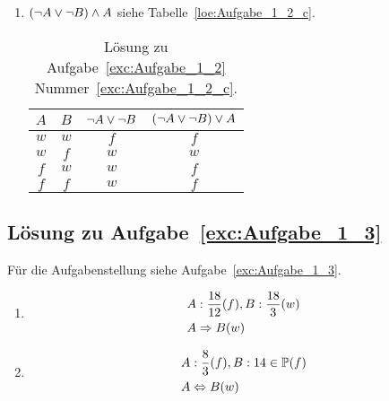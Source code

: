 \begin{enumerate}
\item $\left(\neg A \vee \neg B\right) \wedge A$ siehe Tabelle~\vref{loe:Aufgabe_1_2_c}.
	\begin{table}[htb]
	\center
	\begin{tabular}{c|c||c|c}
	$A$ & $B$ & $\neg A \vee \neg B$ & $\left(\neg A \vee \neg B\right) \vee A$\\\hline
	$w$ & $w$ & $f$ & $f$\\
	$w$ & $f$ & $w$ & $w$\\
	$f$ & $w$ & $w$ & $f$\\
	$f$ & $f$ & $w$ & $f$\\
	\end{tabular}
	\caption{Lösung zu Aufgabe~\ref{exc:Aufgabe_1_2} Nummer~\ref{exc:Aufgabe_1_2_c}.}
	\label{loe:Aufgabe_1_2_c}
	\end{table}
\end{enumerate}

\subsection{Lösung zu Aufgabe~\ref{exc:Aufgabe_1_3}}
Für die Aufgabenstellung siehe Aufgabe~\vref{exc:Aufgabe_1_3}.
\label{loe:Aufgabe_1_3}
\begin{enumerate}
\item \begin{align*}
	&A: \frac{18}{12} (f), B: \frac{18}{3} (w)\\
	&A \Rightarrow B (w)
	\end{align*}

\item \begin{align*}
	&A: \frac{8}{3} (f), B: 14 \in \mathbb{P} (f)\\
	&A \Leftrightarrow B (w)
	\end{align*}
\end{enumerate}

